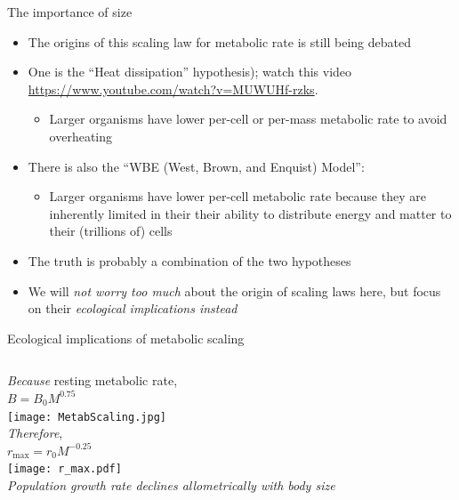 \begin{frame}{The importance of size}

  \begin{itemize} [<+->]\setlength{\itemindent}{-1em} \itemsep6pt
    \item The origins of this scaling law for metabolic rate is still being debated
    \item One is the ``Heat dissipation'' hypothesis); watch this video \small \url{https://www.youtube.com/watch?v=MUWUHf-rzks}.
    \begin{itemize}
      \item Larger organisms have lower per-cell or per-mass metabolic rate to avoid overheating
    \end{itemize}
    \item There is also the ``WBE (West, Brown, and Enquist) Model'':
      \begin{itemize}
        \item Larger organisms have lower per-cell metabolic rate because they are inherently limited in their their ability to distribute energy and matter to their (trillions of) cells
      \end{itemize}   
    \item The truth is probably a combination of the two hypotheses      
    \item We will {\it not worry too much} about the origin of scaling laws here, but focus on their {\it ecological implications instead}
  \end{itemize}

\end{frame}

\begin{frame}{Ecological implications of metabolic scaling}

  \begin{columns}[c]
    \centering
    {\it Because} resting metabolic rate,\\ 
    $B = B_0 M^{0.75}$\\
      \texttt{[image: MetabScaling.jpg]}\\
    \centering
    \pause
    {\it Therefore},\\ 
    $r_\text{max} = r_0 M^{-0.25} $\\
      \texttt{[image: r\_max.pdf]}\\
    {\small \it Population growth rate declines {\it allometrically} with body size}  
  \end{columns}
 
\end{frame}

